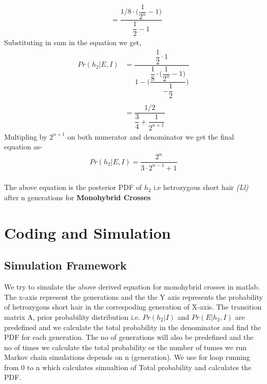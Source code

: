 \documentclass{article}
\begin{document}
\begin{itemize}
\begin{align*}
    &= \dfrac{1/8\cdot\Big(\dfrac{1}{2^n} - 1\Big)}{\dfrac{1}{2} - 1}
    \end{align*}
     Substituting in sum in the equation we get,
    \begin{align*}
    Pr(h_2|E,I) &= \dfrac{\dfrac{1}{2}\cdot 1}{1 - \Big(\dfrac{\dfrac{1}{8}\cdot\Big(\dfrac{1}{2^n} - 1\Big)}{-\dfrac{1}{2}}\Big) }\\\\
    &= \dfrac{1/2}{\dfrac{3}{4} + \dfrac{1}{2^{n+1}}}
    \end{align*}
     Multipling by $ 2^{n+1} $ on both numerator and denominator we get the final equation as-
    \begin{align*}
    \boxed{Pr(h_2|E,I) = \dfrac{2^n}{3\cdot 2^{n-1} + 1}}
    \end{align*}\\
    The above equation is the posterior PDF of $ h_2 $ i.e hetrozygous short hair \textit{(Ll)} after n generations for \textbf{Monohybrid Crosses}
     
    
    
 \end{itemize}



\section{Coding and Simulation} 
\subsection{Simulation Framework}
\justify We try to simulate the above derived equation for monohybrid crosses in matlab. The x-axis represent the generations and the the Y axis represents the probability of hetrozygous short hair in the correspoding generation of X-axis.
The transition matrix A, prior probability distribution i.e. $Pr(h_2|I) $ and $ Pr(E|h_2,I) $ are predefined and we calculate the total probability in the denominator and find the PDF for each generation. The no of generations will also be predefined and the no of times we calculate the total probability or the number of tumes we run Markov chain simulations depends on n (generation). We use for loop running from 0 to n which calculates simualtion of Total probability and calculates the PDF.
\end{document}
